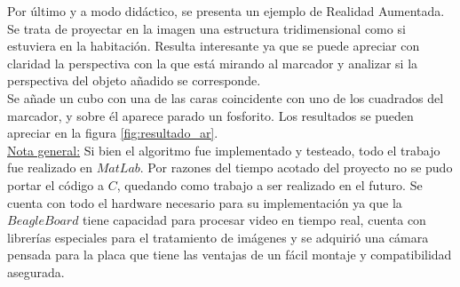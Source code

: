 \documentclass[main]{subfiles}
\begin{document}
Por último y a modo didáctico, se presenta un ejemplo de Realidad Aumentada. Se trata de proyectar en la imagen una estructura tridimensional como si estuviera en la habitación. Resulta interesante ya que se puede apreciar con claridad la perspectiva con la que está mirando al marcador y analizar si la perspectiva del objeto añadido se corresponde.\\

Se añade un cubo con una de las caras coincidente con uno de los cuadrados del marcador, y sobre él aparece parado un fosforito. Los resultados se pueden apreciar en la figura \ref{fig:resultado_ar}.\\[45pt]

\underline{Nota general:} Si bien el algoritmo fue implementado y testeado, todo el trabajo fue realizado en $MatLab$. Por razones del tiempo acotado del proyecto no se pudo portar el código a $C$, quedando como trabajo a ser realizado en el futuro. Se cuenta con todo el hardware necesario para su implementación ya que la $BeagleBoard$ tiene capacidad para procesar video en tiempo real, cuenta con librerías especiales para el tratamiento de imágenes y se adquirió una cámara pensada para la placa que tiene las ventajas de un fácil montaje y compatibilidad asegurada.
\end{document}
